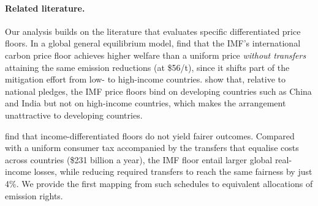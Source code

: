 \documentclass[12pt,english]{article}
\theoremstyle{remark}
\begin{document}
\paragraph{Related literature.}
Our analysis builds on the literature that evaluates specific differentiated price floors. %
In a global general equilibrium model, \citet{chateau_global_2024} find that the IMF's international carbon price floor \citep{parry_proposal_2021} achieves higher welfare than a uniform price \textit{without transfers} attaining the same emission reductions (at \$56/t), since it shifts part of the mitigation effort from low- to high-income countries. 
\citet{he_analysis_2024} show that, relative to national pledges, the IMF price floors bind on developing countries such as China and India but not on high-income countries, which makes the arrangement unattractive to developing countries. 

\citet{le_moigne_distributional_2026} find that income-differentiated floors do not yield fairer outcomes. Compared with a uniform consumer tax accompanied by the transfers that equalise costs across countries (\$231 billion a year), the IMF floor entail larger global real-income losses, while reducing required transfers to reach the same fairness by just 4\%. We provide the first mapping from such schedules to equivalent allocations of emission rights. 
\end{document}
